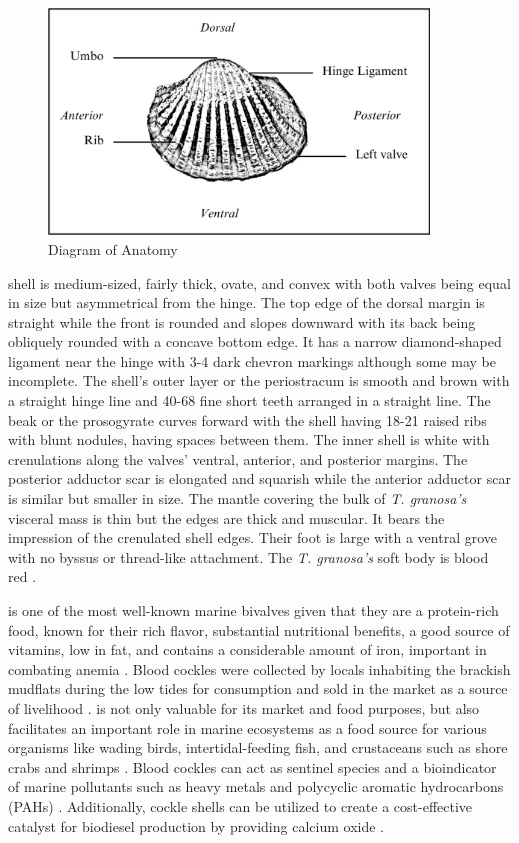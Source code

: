 \begin{figure}[!htbp]
	\centering
	\includegraphics[width=0.9\textwidth]{figures/anatomy.png}
	\caption{Diagram of \Tegillarcagranosa Anatomy}
\end{figure}

\textit{\Tgranosa} shell is medium-sized, fairly thick, ovate, and convex with both valves being equal in size but asymmetrical from the hinge. The top edge of the dorsal margin is straight while the front is rounded and slopes downward with its back being obliquely rounded with a concave bottom edge. It has a narrow diamond-shaped ligament near the hinge with 3-4 dark chevron markings although some may be incomplete. The shell’s outer layer or the periostracum is smooth and brown with a straight hinge line and 40-68 fine short teeth arranged in a straight line. The beak or the prosogyrate curves forward with the shell having 18-21 raised ribs with blunt nodules, having spaces between them. The inner shell is white with crenulations along the valves' ventral, anterior, and posterior margins. The posterior adductor scar is elongated and squarish while the anterior adductor scar is similar but smaller in size. The mantle covering the bulk of \textit{T. granosa’s} visceral mass is thin but the edges are thick and muscular. It bears the impression of the crenulated shell edges. Their foot is large with a ventral grove with no byssus or thread-like attachment. The  \textit{T. granosa’s} soft body is blood red \cite{narasimham1988}.  

\Tgranosa is one of the most well-known marine bivalves given that they are a protein-rich food, known for their rich flavor, substantial nutritional benefits, a good source of vitamins, low in fat, and contains a considerable amount of iron, important in combating anemia \cite{zha2022}. Blood cockles were collected by locals inhabiting the brackish mudflats during the low tides for consumption and sold in the market as a source of livelihood \cite{miranda2023}. \Tgranosa is not only valuable for its market and food purposes, but also facilitates an important role in marine ecosystems as a food source for various organisms like wading birds, intertidal-feeding fish, and crustaceans such as shore crabs and shrimps \cite{burdon2014}. Blood cockles can act as sentinel species and a bioindicator of marine pollutants such as heavy metals \cite{ishak2016} and polycyclic aromatic hydrocarbons (PAHs) \cite{sany2014}. Additionally, cockle shells can be utilized to create a cost-effective catalyst for biodiesel production by providing calcium oxide \cite{boey2011waste}.

